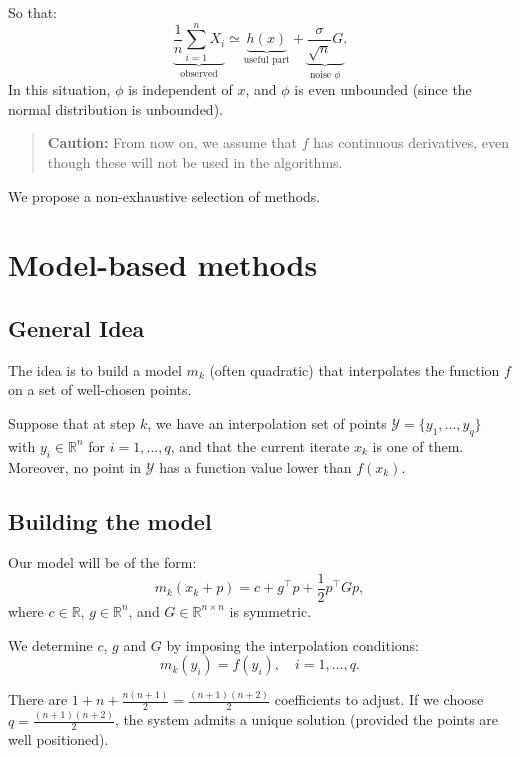 So that:
\[
    \underbrace{\frac{1}{n} \sum_{i=1}^n X_i}_{\text{observed}}
    \simeq
    \underbrace{h(x)}_{\text{useful part}}
    +
    \underbrace{\frac{\sigma}{\sqrt{n}} G}_{\text{noise } \phi}.
\]
In this situation, $\phi$ is independent of $x$, and $\phi$ is even unbounded (since the normal distribution is unbounded).

\begin{quote}
    \textbf{Caution:} From now on, we assume that $f$ has continuous derivatives, even though these will not be used in the algorithms.
\end{quote}

We propose a non-exhaustive selection of methods.

\section{Model-based methods}

\subsection{General Idea}
The idea is to build a model $m_k$ (often quadratic) that interpolates the function $f$ on a set of well-chosen points.

Suppose that at step $k$, we have an interpolation set of points $\mathcal{Y} = \{y_1, \dots, y_q\}$ with $y_i \in \mathbb{R}^n$ for $i=1, \dots, q$, and that the current iterate $x_k$ is one of them. Moreover, no point in $\mathcal{Y}$ has a function value lower than $f(x_k)$.

\subsection{Building the model}

Our model will be of the form:
\begin{equation}
    m_k(x_k + p) = c + g^\top p + \frac{1}{2} p^\top G p,
\end{equation}
where $c \in \mathbb{R}$, $g \in \mathbb{R}^n$, and $G \in \mathbb{R}^{n \times n}$ is symmetric.

We determine $c$, $g$ and $G$ by imposing the interpolation conditions:
\begin{equation}
    m_k(y_i) = f(y_i), \quad i=1, \dots, q.
\end{equation}

There are $1 + n + \frac{n(n+1)}{2} = \frac{(n+1)(n+2)}{2}$ coefficients to adjust.
If we choose $q = \frac{(n+1)(n+2)}{2}$, the system admits a unique solution (provided the points are well positioned).

